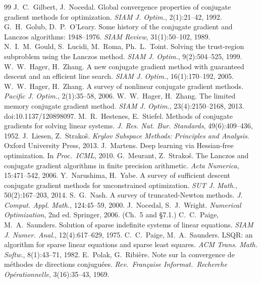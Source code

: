 \documentclass[11pt,a4paper]{article}
\theoremstyle{remark}
\begin{document}
\begin{thebibliography}{99}
 J.~C.~Gilbert, J.~Nocedal. Global convergence properties of conjugate gradient methods for optimization. \emph{SIAM J. Optim.}, 2(1):21--42, 1992.
 G.~H.~Golub, D.~P.~O'Leary. Some history of the conjugate gradient and Lanczos algorithms: 1948--1976. \emph{SIAM Review}, 31(1):50--102, 1989.
 N.~I.~M.~Gould, S.~Lucidi, M.~Roma, Ph.~L.~Toint. Solving the trust-region subproblem using the Lanczos method. \emph{SIAM J. Optim.}, 9(2):504--525, 1999.
 W.~W.~Hager, H.~Zhang. A new conjugate gradient method with guaranteed descent and an efficient line search. \emph{SIAM J. Optim.}, 16(1):170--192, 2005.
 W.~W.~Hager, H.~Zhang. A survey of nonlinear conjugate gradient methods. \emph{Pacific J. Optim.}, 2(1):35--58, 2006.
 W.~W.~Hager, H.~Zhang. The limited memory conjugate gradient method. \emph{SIAM J. Optim.}, 23(4):2150--2168, 2013. doi:10.1137/120898097.
 M.~R.~Hestenes, E.~Stiefel. Methods of conjugate gradients for solving linear systems. \emph{J. Res. Nat. Bur. Standards}, 49(6):409--436, 1952.
 J.~Liesen, Z.~Strako\v{s}. \emph{Krylov Subspace Methods: Principles and Analysis}. Oxford University Press, 2013.
 J.~Martens. Deep learning via Hessian-free optimization. In \emph{Proc.\ ICML}, 2010.
 G.~Meurant, Z.~Strako\v{s}. The Lanczos and conjugate gradient algorithms in finite precision arithmetic. \emph{Acta Numerica}, 15:471--542, 2006.
 Y.~Narushima, H.~Yabe. A survey of sufficient descent conjugate gradient methods for unconstrained optimization. \emph{SUT J. Math.}, 50(2):167--203, 2014.
 S.~G.~Nash. A survey of truncated-Newton methods. \emph{J. Comput. Appl. Math.}, 124:45--59, 2000.
 J.~Nocedal, S.~J.~Wright. \emph{Numerical Optimization}, 2nd ed. Springer, 2006. (Ch.~5 and §7.1.)
 C.~C.~Paige, M.~A.~Saunders. Solution of sparse indefinite systems of linear equations. \emph{SIAM J. Numer. Anal.}, 12(4):617--629, 1975.
 C.~C.~Paige, M.~A.~Saunders. LSQR: an algorithm for sparse linear equations and sparse least squares. \emph{ACM Trans. Math. Softw.}, 8(1):43--71, 1982.
 E.~Polak, G.~Ribi\`ere. Note sur la convergence de m\'ethodes de directions conjugu\'ees. \emph{Rev.\ Fran\c{c}aise Informat.\ Recherche Op\'erationnelle}, 3(16):35--43, 1969.

\end{thebibliography}
\end{document}
